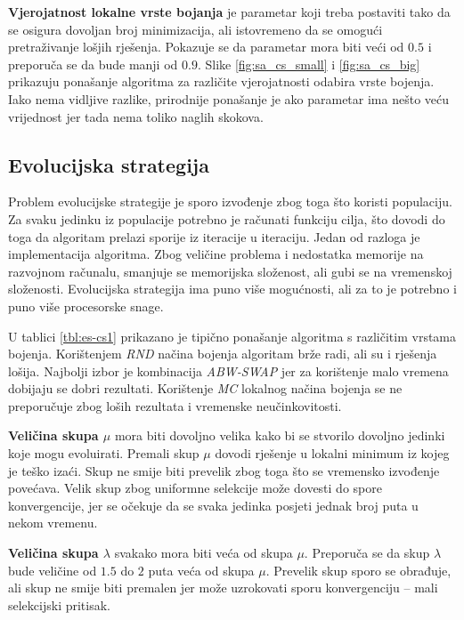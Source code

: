 \documentclass[times, utf8, diplomski, numeric]{fer}
\begin{document}
\textbf{Vjerojatnost lokalne vrste bojanja} je parametar koji treba postaviti tako da se osigura dovoljan broj minimizacija, ali istovremeno da se omogući pretraživanje lošjih rješenja. Pokazuje se da parametar mora biti veći od $0.5$ i preporuča se da bude manji od $0.9$. Slike \ref{fig:sa_cs_small} i \ref{fig:sa_cs_big} prikazuju ponašanje algoritma za različite vjerojatnosti odabira vrste bojenja. Iako nema vidljive razlike, prirodnije ponašanje je ako parametar ima nešto veću vrijednost jer tada nema toliko naglih skokova.

\subsection{Evolucijska strategija}

Problem evolucijske strategije je sporo izvođenje zbog toga što koristi populaciju. Za svaku jedinku iz populacije potrebno je računati funkciju cilja, što dovodi do toga da algoritam prelazi sporije iz iteracije u iteraciju. Jedan od razloga je implementacija algoritma. Zbog veličine problema i nedostatka memorije na razvojnom računalu, smanjuje se memorijska složenost, ali gubi se na vremenskoj složenosti. Evolucijska strategija ima puno više mogućnosti, ali za to je potrebno i puno više procesorske snage.

U tablici \ref{tbl:es-cs1} prikazano je tipično ponašanje algoritma s različitim vrstama bojenja. Korištenjem \emph{RND} načina bojenja algoritam brže radi, ali su i rješenja lošija. Najbolji izbor je kombinacija \emph{ABW-SWAP} jer za korištenje malo vremena dobijaju se dobri rezultati. Korištenje \emph{MC} lokalnog načina bojenja se ne preporučuje zbog loših rezultata i vremenske neučinkovitosti.

\textbf{Veličina skupa $\mu$} mora biti dovoljno velika kako bi se stvorilo dovoljno jedinki koje mogu evoluirati. Premali skup $\mu$ dovodi rješenje u lokalni minimum iz kojeg je teško izaći. Skup ne smije biti prevelik zbog toga što se vremensko izvođenje povećava. Velik skup zbog uniformne selekcije može dovesti do spore konvergencije, jer se očekuje da se svaka jedinka posjeti jednak broj puta u nekom vremenu.

\textbf{Veličina skupa $\lambda$} svakako mora biti veća od skupa $\mu$. Preporuča se da skup $\lambda$ bude veličine od $1.5$ do $2$ puta veća od skupa $\mu$. Prevelik skup sporo se obrađuje, ali skup ne smije biti premalen jer može uzrokovati sporu konvergenciju -- mali selekcijski pritisak.
\end{document}
